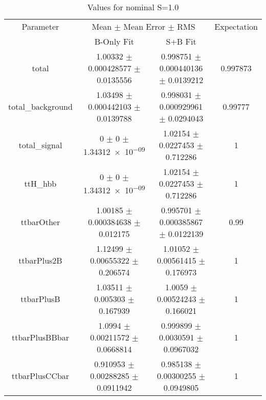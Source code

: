 \begin{table}
\centering
\caption{Values for nominal S=1.0}
\begin{tabular}{cccc}
\toprule
Parameter & \multicolumn{2}{c}{Mean $\pm$ Mean Error $\pm$ RMS} & Expectation\\
 & B-Only Fit & S+B Fit & \\
\midrule
total & \num{1.00332} $\pm$ \num{0.000428577} $\pm$ \num{0.0135556} & \num{0.998751} $\pm$ \num{0.000440136} $\pm$ \num{0.0139212} & \num{0.997873}\\
total\_background & \num{1.03498} $\pm$ \num{0.000442103} $\pm$ \num{0.0139788} & \num{0.998031} $\pm$ \num{0.000929961} $\pm$ \num{0.0294043} & \num{0.99777}\\
total\_signal & \num{0} $\pm$ \num{0} $\pm$ \num{1.34312e-09} & \num{1.02154} $\pm$ \num{0.0227453} $\pm$ \num{0.712286} & \num{1}\\
ttH\_hbb & \num{0} $\pm$ \num{0} $\pm$ \num{1.34312e-09} & \num{1.02154} $\pm$ \num{0.0227453} $\pm$ \num{0.712286} & \num{1}\\
ttbarOther & \num{1.00185} $\pm$ \num{0.000384638} $\pm$ \num{0.012175} & \num{0.995701} $\pm$ \num{0.000385867} $\pm$ \num{0.0122139} & \num{0.99}\\
ttbarPlus2B & \num{1.12499} $\pm$ \num{0.00655322} $\pm$ \num{0.206574} & \num{1.01052} $\pm$ \num{0.00561415} $\pm$ \num{0.176973} & \num{1}\\
ttbarPlusB & \num{1.03511} $\pm$ \num{0.005303} $\pm$ \num{0.167939} & \num{1.0059} $\pm$ \num{0.00524243} $\pm$ \num{0.166021} & \num{1}\\
ttbarPlusBBbar & \num{1.0994} $\pm$ \num{0.00211572} $\pm$ \num{0.0668814} & \num{0.999899} $\pm$ \num{0.0030591} $\pm$ \num{0.0967032} & \num{1}\\
ttbarPlusCCbar & \num{0.910953} $\pm$ \num{0.00288285} $\pm$ \num{0.0911942} & \num{0.985138} $\pm$ \num{0.00300255} $\pm$ \num{0.0949805} & \num{1}\\
\bottomrule
\end{tabular}
\end{table}